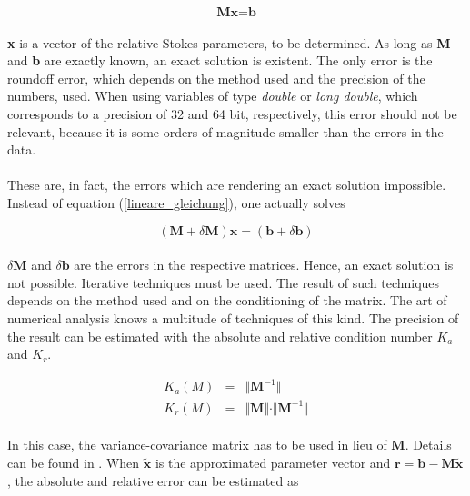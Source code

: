 \documentclass[a4paper,10pt]{thesis}
\begin{document}
\begin{equation}
\textbf{M}\textbf{x}=\textbf{b}\nonumber
\end{equation}

\paragraph*{}
\textbf{x} is a vector of the relative Stokes parameters, to be determined. As long as \textbf{M} and \textbf{b} are exactly known, an exact solution is existent. The only error is the roundoff error, which depends on the method used and the precision of the numbers, used. When using variables of type \textit{double} or \textit{long double}, which corresponds to a precision of 32 and 64 bit, respectively, this error should not be relevant, because it is some orders of magnitude smaller than the errors in the data.

\paragraph*{}
These are, in fact, the errors which are rendering an exact solution impossible. Instead of equation (\ref{lineare_gleichung}), one actually solves

\begin{equation}\label{lineare_gleichung_mit_error}
(\textbf{M}+\delta \textbf{M})\textbf{x}=(\textbf{b}+\delta \textbf{b})
\end{equation}

\paragraph*{}
$\delta \textbf{M}$ and $\delta \textbf{b}$ are the errors in the respective matrices. Hence, an exact solution is not possible. Iterative techniques must be used. The result of such techniques depends on the method used and on the conditioning of the matrix. The art of numerical analysis knows a multitude of techniques of this kind. The precision of the result can be estimated with the absolute and relative condition number $K_a$ and $K_r$.


\begin{eqnarray}
K_a(M)&=&\Vert \textbf{M}^{-1} \Vert  \label{K_a} \\
K_r(M)&=&\Vert \textbf{M} \Vert \cdot \Vert \textbf{M}^{-1} \Vert \label{K_r}
\end{eqnarray}

\paragraph*{}
In this case, the variance-covariance matrix has to be used in lieu of \textbf{M}. Details can be found in \cite{burdenfaires}. When $\tilde{\textbf{x}}$ is the approximated parameter vector and $\textbf{r}=\textbf{b} - \textbf{M} \tilde{\textbf{x}}$, the absolute and relative error can be estimated as
\end{document}
